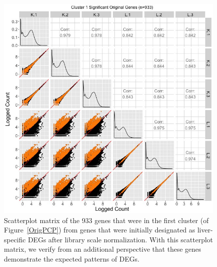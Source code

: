 \documentclass{article}
\begin{document}
\null
\begin{figure}[t!]
\centerline{\includegraphics[width=1\columnwidth]{../MakeFigures/lkClustersOrigSM.jpg}}
\caption{Scatterplot matrix of the 933 genes that were in the first cluster (of Figure~\ref{OrigPCP}) from genes that were initially designated as liver-specific DEGs after library scale normalization. With this scatterplot matrix, we verify from an additional perspective that these genes demonstrate the expected patterns of DEGs.
\label{lkClustersOrigSM}}
\end{figure}
\end{document}
